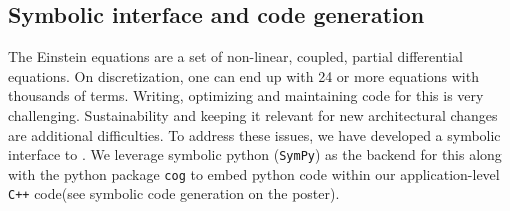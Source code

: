\documentclass[10pt, conference]{IEEEtran} %
\begin{document}
\subsection{Symbolic interface and code generation}
The Einstein equations are a set of non-linear, coupled, partial 
differential equations. On discretization, one can end up with 24 or 
more equations with thousands of terms. Writing, optimizing and maintaining 
code for this is very challenging. Sustainability and keeping it relevant for new 
architectural changes are additional difficulties. To address these issues, we 
have developed a symbolic interface to \dendrogr. We leverage symbolic python 
(\texttt{SymPy}) as the backend for this along with the python package 
\texttt{cog} to embed python code within our application-level \texttt{C++} 
code(see symbolic code generation on the poster).



\end{document}
